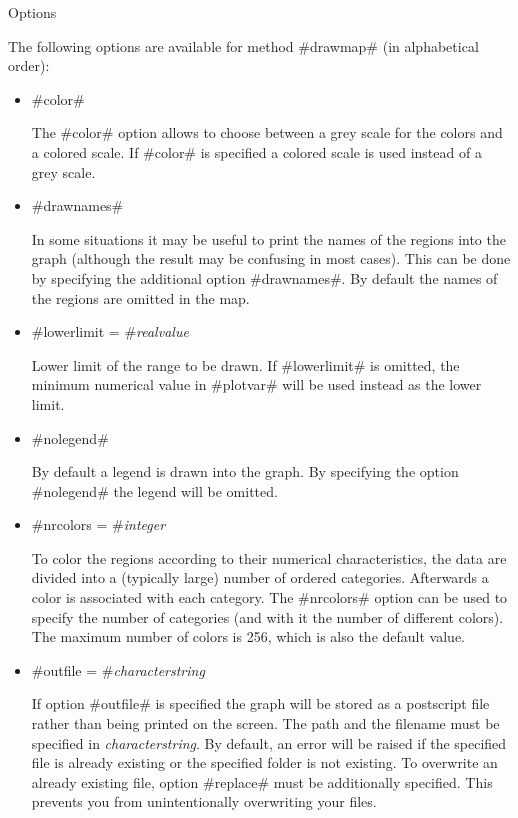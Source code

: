 \begin{stanza}{Options}

The following options are available for method #drawmap# (in
alphabetical order):

\end{stanza}

\begin{itemize}
\item #color#

The #color# option allows to choose between a grey scale for the
colors and a colored scale. If #color# is specified a colored
scale is used instead of a grey scale.

\item #drawnames#

In some situations it may be useful to print the names of the
regions into the graph (although the result may be confusing in
most cases). This can be done by specifying the additional option
#drawnames#. By default the names of the regions are omitted in
the map.

\item #lowerlimit = #{\em realvalue}

Lower limit of the range to be drawn. If #lowerlimit# is omitted,
the minimum numerical value in #plotvar# will be used instead as
the lower limit.

\item #nolegend#

By default a legend is drawn into the graph. By specifying the
option #nolegend# the legend will be omitted.

\item #nrcolors = #{\em integer}

To color the regions according to their numerical characteristics,
the data are divided into a (typically large) number of ordered
categories. Afterwards a color is associated with each category. The
#nrcolors# option can be used to specify the number of categories
(and with it the number of different colors). The maximum number of
colors is 256, which is also the default value.

\item #outfile = #{\em characterstring}

If option #outfile# is specified the graph will be stored as a
postscript file rather than being printed on the screen. The path
and the filename must be specified in {\em characterstring}. By
default, an error will be raised if the specified file is already
existing or the specified folder is not existing. To overwrite an
already existing file, option #replace# must be additionally
specified. This prevents you from unintentionally overwriting your
files.


\end{itemize}
